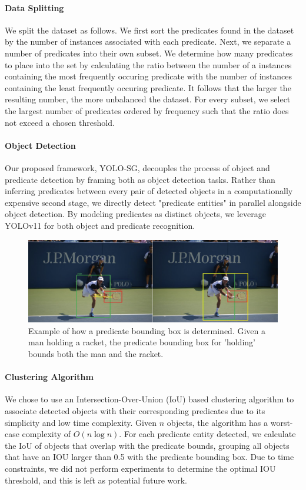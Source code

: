\documentclass{article}
\begin{document}
\paragraph{Data Splitting}
We split the dataset as follows. We first sort the predicates found in the dataset by the number of instances associated with each predicate. Next, we separate a number of predicates into their own subset. We determine how many predicates to place into the set by calculating the ratio between the number of a instances containing the most frequently occuring predicate with the number of instances containing the least frequently occuring predicate. It follows that the larger the resulting number, the more unbalanced the dataset. For every subset, we select the largest number of predicates ordered by frequency such that the ratio does not exceed a chosen threshold. 

\paragraph{Object Detection}
Our proposed framework, YOLO-SG, decouples the process of object and predicate detection by framing both as object detection tasks. Rather than inferring predicates between every pair of detected objects in a computationally expensive second stage, we directly detect "predicate entities" in parallel alongside object detection. By modeling predicates as distinct objects, we leverage YOLOv11\cite{ultralytics11} for both object and predicate recognition. 
\begin{figure}
    \includegraphics[width=\textwidth]{figures/figure1.png}
  \centering
  \caption{Example of how a predicate bounding box is determined. Given a man holding a racket, the predicate bounding box for 'holding' bounds both the man and the racket.}
\end{figure}

\paragraph{Clustering Algorithm}
We chose to use an Intersection-Over-Union (IoU) based clustering algorithm to associate detected objects with their corresponding predicates due to its simplicity and low time complexity. Given $n$ objects, the algorithm has a worst-case complexity of $O(n \log n)$. For each predicate entity detected, we calculate the IoU of objects that overlap with the predicate bounds, grouping all objects that have an IOU larger than 0.5 with the predicate bounding box. Due to time constraints, we did not perform experiments to determine the optimal IOU threshold, and this is left as potential future work.
\end{document}
